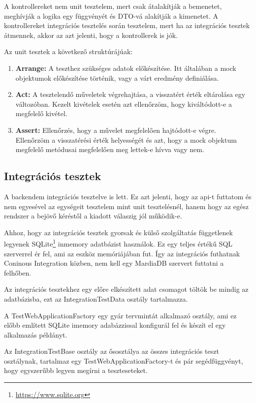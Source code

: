 A kontrollereket nem unit tesztelem, mert csak átalakítják a bemenetet, meghívják a logika egy függvényét és DTO-vá alakítják a kimenetet. A kontrollereket integrációs tesztelés során tesztelem, mert ha az integrációs tesztek átmennek, akkor az azt jelenti, hogy a kontrollerek is jók.

Az unit tesztek a következő struktúrájúak:
\begin{enumerate}
	\item \textbf{Arrange:} A teszthez szükséges adatok előkészítése. Itt általában a mock objektumok előkészítése történik, vagy a várt eredmény definiálása.
	\item \textbf{Act:} A tesztelendő műveletek végrehajtása, a visszatért érték eltárolása egy változóban. Kezelt kivételek esetén azt ellenőrzöm, hogy kiváltódott-e a megfelelő kivétel.
	\item \textbf{Assert:} Ellenőrzés, hogy a művelet megfelelően hajtódott-e végre. Ellenőrzöm a visszatérési érték helyességét és azt, hogy a mock objektum megfelelő metódusai megfelelően meg lettek-e hívva vagy nem.
\end{enumerate}

\subsection{Integrációs tesztek}
A backendem integrációs tesztelve is lett. Ez azt jelenti, hogy az api-t futtatom és nem egyesével az egységeit tesztelem mint unit tesztelésnél, hanem hogy az egész rendszer a bejövő kéréstől a kiadott válaszig jól működik-e.

Ahhoz, hogy az integrációs tesztek gyorsak és külső szolgáltatás függetlenek legyenek SQLite\footnote{\url{https://www.sqlite.org}} inmemory adatbázist használok. Ez egy teljes értékű SQL szerverrel ér fel, ami az eszköz memóriájában fut. Így az integrációs futhatnak Coninous Integration közben, nem kell egy MardiaDB szervert futtatni a felhőben.

Az integrációs tesztekhez egy előre elkészített adat csomagot töltök be mindig az adatbázisba, ezt az IntegrationTestData osztály tartalmazza.

A TestWebApplicationFactory egy gyár tervmintát alkalmazó osztály, ami ez előbb említett SQLite imemory adabázzissal konfigurál fel és készít el egy alkalmazás példányt.

Az IntegrationTestBase osztály az ősosztálya az összes integrációs teszt osztálynak, tartalmaz egy TestWebApplicationFactory-t és pár segédfüggvényt, hogy egyszerűbb legyen megírni a teszteseteket.


